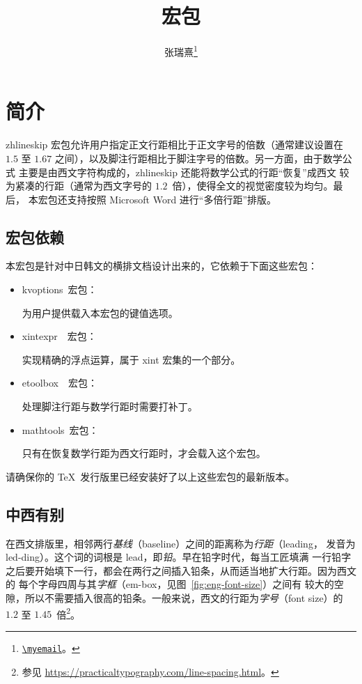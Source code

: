 \documentclass[
  zihao=5,
  no-math,a4paper]{ctexart}
\title{\vspace*{-18bp}\pkg{zhlineskip} 宏包}
\author{张瑞熹\thanks{\href{mailto:\myemail}{\nolinkurl{\myemail}}。}}
\date{2018/10/28\hskip\ccwd\relax v1.0c}
\newcommand\pkg[1]{{\normalfont\ttfamily#1}}
\newcommand*\packagedependency[1]{%
  \mbox{\pkg{#1}~宏包：}\ignorespaces
}
\begin{document}
\maketitle

\tableofcontents

\section{简介}

\pkg{zhlineskip} 宏包允许用户指定正文行距相比于正文字号的倍数（通常建议设置在
$1.5$ 至 $1.67$ 之间），以及脚注行距相比于脚注字号的倍数。另一方面，由于数学公式
主要是由西文字符构成的，\pkg{zhlineskip} 还能将数学公式的行距“恢复”成西文
较为紧凑的行距（通常为西文字号的 $1.2$~倍），使得全文的视觉密度较为均匀。最后，
本宏包还支持按照 Microsoft Word 进行“多倍行距”排版。

\subsection{宏包依赖}

本宏包是针对中日韩文的横排文档设计出来的，它依赖于下面这些宏包：
\begin{itemize}
\item \packagedependency{kvoptions}
为用户提供载入本宏包的键值选项。
\item \packagedependency{xintexpr~}
实现精确的浮点运算，属于 \pkg{xint} 宏集的一个部分。
\item \packagedependency{etoolbox~}
处理脚注行距与数学行距时需要打补丁。
\item \packagedependency{mathtools}
只有在恢复数学行距为西文行距时，才会载入这个宏包。
\end{itemize}
请确保你的 \TeX\ 发行版里已经安装好了以上这些宏包的最新版本。

\subsection{中西有别}

在西文排版里，相邻两行\emph{基线}（baseline）之间的距离称为\emph{行距}（leading，
发音为 led-ding）。这个词的词根是 lead，即\emph{铅}。早在铅字时代，每当工匠填满
一行铅字之后要开始填下一行，都会在两行之间插入铅条，从而适当地扩大行距。因为西文的
每个字母四周与其\emph{字框}（em-box，见图~\ref{fig:eng-font-size}）之间有
较大的空隙，所以不需要插入很高的铅条。一般来说，西文的行距为\emph{字号}（font
size）的 $1.2$ 至 $1.45$~倍\footnote{参见
\url{https://practicaltypography.com/line-spacing.html}。}。
\end{document}
